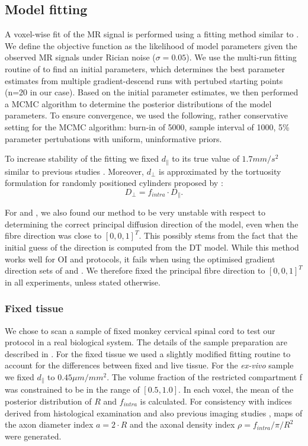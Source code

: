 \subsection{Model fitting}
A voxel-wise fit of the MR signal is performed using a fitting method similar to \citet{Alexander:2010}. We define the objective function as the likelihood of model parameters given the observed MR signals under Rician noise ($\sigma=0.05$). We use the multi-run fitting routine of \citet{Panagiotaki:2012} to find an initial parameters, which determines the best parameter estimates from multiple gradient-descend runs with pertubed starting points (n=20 in our case). Based on the initial parameter estimates, we then performed a \gls{MCMC} algorithm to determine the posterior distributions of the model parameters. To ensure convergence, we used the following, rather conservative setting for the \gls{MCMC} algorithm: burn-in of 5000, sample interval of 1000, 5\% parameter pertubations with uniform, uninformative priors.

To increase stability of the fitting we fixed $d_\parallel$ to its true value of $1.7mm/s^2$ similar to previous studies \citep{Assaf:2008,Barazany:2009,Alexander:2010}. Moreover, $d_\bot$ is approximated by the tortuosity formulation for randomly positioned cylinders proposed by \citet{Szafer:1995}:
\begin{equation}
    D_{\bot} = f_{intra}\cdot D_{\parallel}.
\end{equation}


For {\DO} and {\FD}, we also found our method to be very unstable with respect to determining the correct principal diffusion direction of the model, even when the fibre direction was close to $[0,0,1]^T$. This possibly stems from the fact that the initial guess of the direction is computed from the \gls{DT} model. While this method works well for {\gls{OI}} and {\SD} protocols, it fails when using the optimised gradient direction sets of {\DO} and {\FD}. We therefore fixed the principal fibre direction to $[0,0,1]^T$ in all experiments, unless stated otherwise.

\subsubsection{Fixed tissue}
We chose to scan a sample of fixed monkey cervical spinal cord to test our protocol in a real biological system. The details of the sample preparation are described in \citep{Lundell:2011}. For the fixed tissue we used a slightly modified fitting routine to account for the differences between fixed and live tissue. For the \emph{ex-vivo} sample we fixed $d_{\|}$ to $0.45\mu m/mm^2$. The volume fraction of the restricted compartment f was constrained to be in the range of $[0.5, 1.0]$. In each voxel, the mean of the posterior distribution of $R$ and $f_{intra}$ is calculated. For consistency with indices derived from histological examination \citep{Keyserlingk:1984,LaMantia:1990a,Aboitiz:1992} and also previous imaging studies \citep{Alexander:2010}, maps of the axon diameter index $a=2\cdot R$ and the axonal density index $\rho=f_{intra}/\pi/R^2$ were generated.


